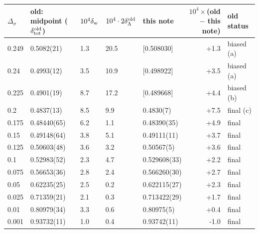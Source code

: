 \begin{tabular}{@{}lllllrl@{}}
\toprule
$\Delta_\sigma$ & old: midpoint ($\delta_{\rm tot}^{\rm old}$) & $10^4\delta_{\rm w}$ & $10^4\cdot2\delta_\Lambda^{\rm old}$ & this note & $10^4\times$(old $-$ this note) & old status\\
\midrule
0.249 & 0.5082(21) & 1.3 & 20.5 & [0.508030] & +1.3 & biased (a)\\
0.24 & 0.4993(12) & 3.5 & 10.9 & [0.498922] & +3.5 & biased (a)\\
0.225 & 0.4901(19) & 8.7 & 17.2 & [0.489668] & +4.4 & biased (b)\\
0.2 & 0.4837(13) & 8.5 & 9.9 & 0.4830(7) & +7.5 & final (c)\\
0.175 & 0.48440(65) & 6.2 & 1.1 & 0.48390(35) & +4.9 & final\\
0.15 & 0.49148(64) & 3.8 & 5.1 & 0.49111(11) & +3.7 & final\\
0.125 & 0.50603(48) & 3.6 & 3.2 & 0.50567(5) & +3.6 & final\\
0.1 & 0.52983(52) & 2.3 & 4.7 & 0.529608(33) & +2.2 & final\\
0.075 & 0.56653(36) & 2.8 & 2.4 & 0.566260(30) & +2.7 & final\\
0.05 & 0.62235(25) & 2.5 & 0.2 & 0.622115(27) & +2.3 & final\\
0.025 & 0.71359(21) & 2.1 & 0.3 & 0.713422(29) & +1.7 & final\\
0.01 & 0.80979(34) & 3.3 & 0.6 & 0.80975(5) & +0.4 & final\\
0.001 & 0.93732(11) & 1.0 & 0.4 & 0.93742(11) & -1.0 & final\\
\bottomrule
\end{tabular}
